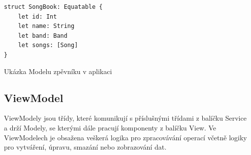 \begin{listing}[H]
\begin{verbatim}
struct SongBook: Equatable {
    let id: Int
    let name: String
    let band: Band
    let songs: [Song]
}
\end{verbatim}
\caption{Ukázka Modelu zpěvníku v aplikaci}
\end{listing}

\subsection{ViewModel}

ViewModely jsou třídy, které komunikují s příslušnými třídami z balíčku Service a drží Modely, se kterými dále pracují komponenty z balíčku View. Ve ViewModelech je obsažena veškerá logika pro zpracovávání operací včetně logiky pro vytváření, úpravu, smazání nebo zobrazování dat.

